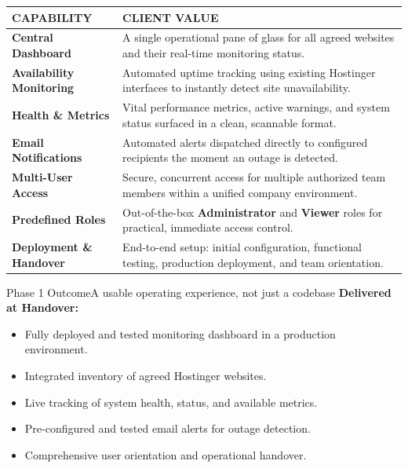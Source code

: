 \documentclass[11pt,a4paper]{article}
\newcommand{\thd}[1]{\textsc{\bfseries\color{white}\fontsize{8.6}{8.6}\selectfont #1}}
\begin{document}
\renewcommand{\arraystretch}{1.7}
\noindent
\begin{longtable}{@{}>{\raggedright\arraybackslash}p{0.28\linewidth}p{0.72\linewidth}@{}}
\rowcolor{navy}
\thd{CAPABILITY} & \thd{CLIENT VALUE} \\
\midrule
\endhead %
\textbf{Central Dashboard} & A single operational pane of glass for all agreed websites and their real-time monitoring status. \\
\rowcolor{tabletint}
\textbf{Availability Monitoring} & Automated uptime tracking using existing Hostinger interfaces to instantly detect site unavailability. \\
\textbf{Health \& Metrics} & Vital performance metrics, active warnings, and system status surfaced in a clean, scannable format. \\
\rowcolor{tabletint}
\textbf{Email Notifications} & Automated alerts dispatched directly to configured recipients the moment an outage is detected. \\
\textbf{Multi-User Access} & Secure, concurrent access for multiple authorized team members within a unified company environment. \\
\rowcolor{tabletint}
\textbf{Predefined Roles} & Out-of-the-box \textbf{Administrator} and \textbf{Viewer} roles for practical, immediate access control. \\
\textbf{Deployment \& Handover} & End-to-end setup: initial configuration, functional testing, production deployment, and team orientation. \\
\bottomrule
\end{longtable}

\vspace{2em}

\begin{recbox}{Phase 1 Outcome}{A usable operating experience, not just a codebase}
\textbf{Delivered at Handover:}
\begin{itemize}
  \item Fully deployed and tested monitoring dashboard in a production environment.
  \item Integrated inventory of agreed Hostinger websites.
  \item Live tracking of system health, status, and available metrics.
  \item Pre-configured and tested email alerts for outage detection.
  \item Comprehensive user orientation and operational handover.
\end{itemize}
\end{recbox}
\end{document}
